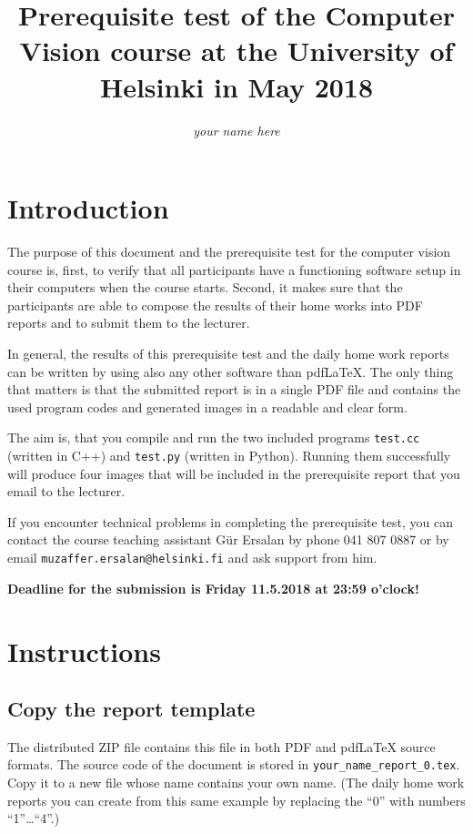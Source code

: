 \documentclass{article}
\begin{document}
\title{Prerequisite test of the Computer Vision course at the
  University of Helsinki in May 2018}

\author{\emph{your name here}}
\maketitle

\newpage

\section{Introduction}

The purpose of this document and the prerequisite test for the
computer vision course is, first, to verify that all participants have
a functioning software setup in their computers when the course
starts.  Second, it makes sure that the participants are able to
compose the results of their home works into PDF reports and to submit
them to the lecturer.

In general, the results of this prerequisite test and the daily home
work reports can be written by using also any other software than
pdf\LaTeX{}.  The only thing that matters is that the submitted report
is in a single PDF file and contains the used program codes and
generated images in a readable and clear form.

The aim is, that you compile and run the two included programs
\texttt{test.cc} (written in C++) and \texttt{test.py} (written in
Python).  Running them successfully will produce four images that will
be included in the prerequisite report that you email to the lecturer.
 
If you encounter technical problems in completing the prerequisite
test, you can contact the course teaching assistant Gür Ersalan by
phone 041 807 0887 or by email \texttt{muzaffer.ersalan@helsinki.fi}
and ask support from him.

\textbf{Deadline for the submission is Friday 11.5.2018 at 23:59 o'clock!}

\section{Instructions}
\label{sec:running}

\subsection{Copy the report template}

The distributed ZIP file contains this file in both PDF and
pdf\LaTeX{} source formats.  The source code of the document is stored
in \texttt{your\_name\_report\_0.tex}.  Copy it to a new file whose
name contains your own name.  (The daily home work reports you can
create from this same example by replacing the ``0'' with numbers
``1''\ldots``4''.)
\end{document}
